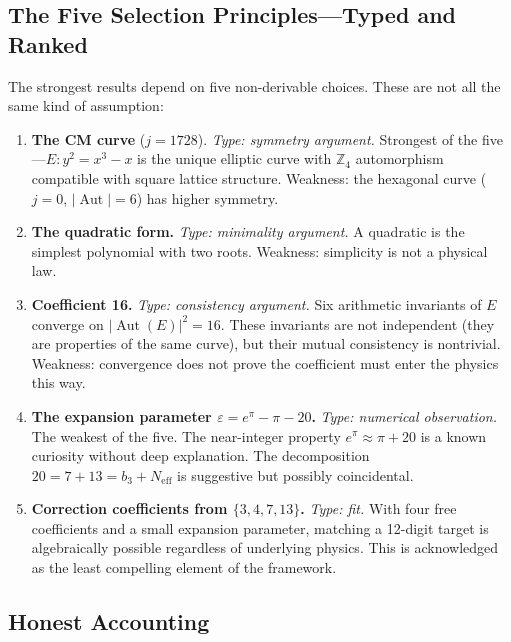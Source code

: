 \documentclass[12pt]{article}
\newcommand{\ZZ}{\mathbb{Z}}
\DeclareMathOperator{\Aut}{Aut}
\theoremstyle{compact}
\begin{document}
\subsection*{The Five Selection Principles---Typed and Ranked}

The strongest results depend on five non-derivable choices. These are not all the same kind of assumption:

\begin{enumerate}[nosep,label=\textbf{SP\arabic*}.]
\item \textbf{The CM curve} ($j = 1728$). \textit{Type: symmetry argument.} Strongest of the five---$E: y^2 = x^3 - x$ is the unique elliptic curve with $\ZZ_4$ automorphism compatible with square lattice structure. Weakness: the hexagonal curve ($j = 0$, $|\Aut| = 6$) has higher symmetry.

\item \textbf{The quadratic form.} \textit{Type: minimality argument.} A quadratic is the simplest polynomial with two roots. Weakness: simplicity is not a physical law.

\item \textbf{Coefficient 16.} \textit{Type: consistency argument.} Six arithmetic invariants of $E$ converge on $|\Aut(E)|^2 = 16$. These invariants are not independent (they are properties of the same curve), but their mutual consistency is nontrivial. Weakness: convergence does not prove the coefficient must enter the physics this way.

\item \textbf{The expansion parameter $\varepsilon = e^\pi - \pi - 20$.} \textit{Type: numerical observation.} The weakest of the five. The near-integer property $e^\pi \approx \pi + 20$ is a known curiosity without deep explanation. The decomposition $20 = 7 + 13 = b_3 + N_{\mathrm{eff}}$ is suggestive but possibly coincidental.

\item \textbf{Correction coefficients from $\{3,4,7,13\}$.} \textit{Type: fit.} With four free coefficients and a small expansion parameter, matching a 12-digit target is algebraically possible regardless of underlying physics. This is acknowledged as the least compelling element of the framework.
\end{enumerate}

\subsection*{Honest Accounting}
\end{document}

